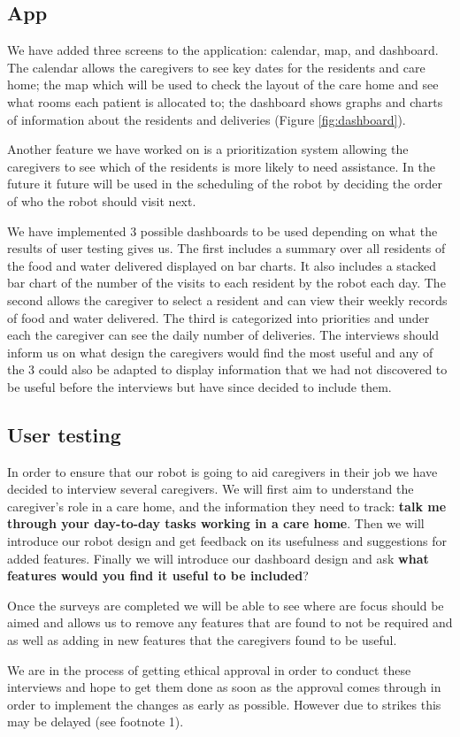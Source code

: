 \documentclass{article}
\begin{document}
\subsection{App}
\par We have added three screens to the application: calendar, map, and dashboard. The calendar allows the caregivers to see key dates for the residents and care home; the map which will be used to check the layout of the care home and see what rooms each patient is allocated to; the dashboard shows graphs and charts of information about the residents and deliveries (Figure \ref{fig:dashboard}). 
\par Another feature we have worked on is a prioritization system allowing the caregivers to see which of the residents is more likely to need assistance. In the future it future will be used in the scheduling of the robot by deciding the order of who the robot should visit next.
\par We have implemented 3 possible dashboards to be used depending on what the results of user testing gives us. The first includes a summary over all residents of the food and water delivered displayed on bar charts. It also includes a stacked bar chart of the number of the visits to each resident by the robot each day. The second allows the caregiver to select a resident and can view their weekly records of food and water delivered. The third is categorized into priorities and under each the caregiver can see the daily number of deliveries. The interviews should inform us on what design the caregivers would find the most useful and any of the 3 could also be adapted to display information that we had not discovered to be useful before the interviews but have since decided to include them.

\subsection{User testing}
\par In order to ensure that our robot is going to aid caregivers in their job we have decided to interview several caregivers. We will first aim to understand the caregiver's role in a care home, and the information they need to track: {\bf talk me through your day-to-day tasks working in a care home}. Then we will introduce our robot design and get feedback on its usefulness and suggestions for added features. Finally we will introduce our dashboard design and ask {\bf what features would you find it useful to be included}?
\par Once the surveys are completed we will be able to see where are focus should be aimed and allows us to remove any features that are found to not be required and as well as adding in new features that the caregivers found to be useful.
\par We are in the process of getting ethical approval in order to conduct these interviews and hope to get them done as soon as the approval comes through in order to implement the changes as early as possible. However due to strikes this may be delayed (see footnote 1).
\end{document}
